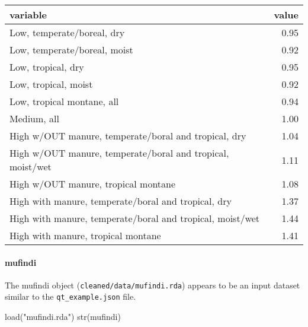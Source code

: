 \documentclass[
]{article}
\newenvironment{Shaded}{\begin{snugshade}}{\end{snugshade}}
\newcommand{\FunctionTok}[1]{\textcolor[rgb]{0.00,0.00,0.00}{#1}}
\newcommand{\NormalTok}[1]{#1}
\newcommand{\StringTok}[1]{\textcolor[rgb]{0.31,0.60,0.02}{#1}}
\begin{document}
\begin{longtable}[]{@{}lr@{}}
\toprule()
variable & value \\
\midrule()
\endhead
Low, temperate/boreal, dry & 0.95 \\
Low, temperate/boreal, moist & 0.92 \\
Low, tropical, dry & 0.95 \\
Low, tropical, moist & 0.92 \\
Low, tropical montane, all & 0.94 \\
Medium, all & 1.00 \\
High w/OUT manure, temperate/boral and tropical, dry & 1.04 \\
High w/OUT manure, temperate/boral and tropical, moist/wet & 1.11 \\
High w/OUT manure, tropical montane & 1.08 \\
High with manure, temperate/boral and tropical, dry & 1.37 \\
High with manure, temperate/boral and tropical, moist/wet & 1.44 \\
High with manure, tropical montane & 1.41 \\
\bottomrule()
\end{longtable}

\hypertarget{mufindi}{%
\paragraph{mufindi}\label{mufindi}}

The mufindi object (\texttt{cleaned/data/mufindi.rda}) appears to be an
input dataset similar to the \texttt{qt\_example.json} file.

\begin{Shaded}
\begin{Highlighting}[]
\FunctionTok{load}\NormalTok{(}\StringTok{"mufindi.rda"}\NormalTok{)}
\FunctionTok{str}\NormalTok{(mufindi)}
\end{Highlighting}
\end{Shaded}
\end{document}
